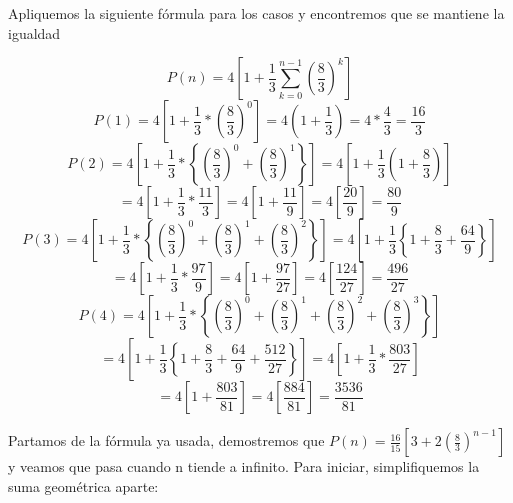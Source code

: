 \documentclass[12pt]{article}
\begin{document}
Apliquemos la siguiente fórmula para los casos y encontremos que se mantiene la igualdad

\begin{equation}
    P(n)=4\left[1+\frac{1}{3}\sum_{k=0}^{n-1}\left(\frac{8}{3}\right)^k\right]
\end{equation}
\begin{equation*}
    P(1)=4\left[1+\frac{1}{3}*\left(\frac{8}{3}\right)^0\right]=4\left(1+\frac{1}{3}\right)=4*\frac{4}{3}=\frac{16}{3}
\end{equation*}
\begin{equation*}
    P(2)=4\left[1+\frac{1}{3}*\left\{\left(\frac{8}{3}\right)^0+\left(\frac{8}{3}\right)^1\right\}\right]=4\left[1+\frac{1}{3}\left(1+\frac{8}{3}\right)\right]
\end{equation*}
\begin{equation*}
    =4\left[1+\frac{1}{3}*\frac{11}{3}\right]=4\left[1+\frac{11}{9}\right]=4\left[\frac{20}{9}\right]=\frac{80}{9}
\end{equation*}
\begin{equation*}
    P(3)=4\left[1+\frac{1}{3}*\left\{\left(\frac{8}{3}\right)^0+\left(\frac{8}{3}\right)^1+\left(\frac{8}{3}\right)^2\right\}\right]=4\left[1+\frac{1}{3}\left\{1+\frac{8}{3}+\frac{64}{9}\right\}\right]
\end{equation*}
\begin{equation*}
    =4\left[1+\frac{1}{3}*\frac{97}{9}\right]=4\left[1+\frac{97}{27}\right]=4\left[\frac{124}{27}\right]=\frac{496}{27}
\end{equation*}
\begin{equation*}
    P(4)=4\left[1+\frac{1}{3}*\left\{\left(\frac{8}{3}\right)^0+\left(\frac{8}{3}\right)^1+\left(\frac{8}{3}\right)^2+\left(\frac{8}{3}\right)^3\right\}\right]
\end{equation*}
\begin{equation*}
    =4\left[1+\frac{1}{3}\left\{1+\frac{8}{3}+\frac{64}{9}+\frac{512}{27}\right\}\right]=4\left[1+\frac{1}{3}*\frac{803}{27}\right]
\end{equation*}
\begin{equation*}
    =4\left[1+\frac{803}{81}\right]=4\left[\frac{884}{81}\right]=\frac{3536}{81}
\end{equation*}

Partamos de la fórmula ya usada, demostremos que $P(n)=\frac{16}{15}\left[3+2\left(\frac{8}{3}\right)^{n-1}\right]$ y veamos que pasa cuando n tiende a infinito. Para iniciar, simplifiquemos la suma geométrica aparte:
\end{document}
